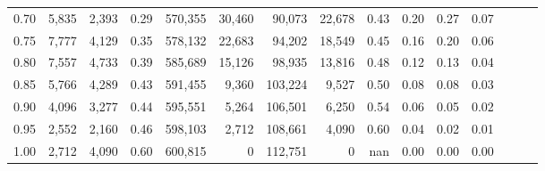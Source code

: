 \begin{tabular}{rrrrrrrrrrrrrrr}
0.70 &    5,835 &   2,393 &  0.29 &  570,355 &   30,460 &   90,073 &   22,678 &  0.43 &  0.20 &  0.27 &      0.07 \\
0.75 &    7,777 &   4,129 &  0.35 &  578,132 &   22,683 &   94,202 &   18,549 &  0.45 &  0.16 &  0.20 &      0.06 \\
0.80 &    7,557 &   4,733 &  0.39 &  585,689 &   15,126 &   98,935 &   13,816 &  0.48 &  0.12 &  0.13 &      0.04 \\
0.85 &    5,766 &   4,289 &  0.43 &  591,455 &    9,360 &  103,224 &    9,527 &  0.50 &  0.08 &  0.08 &      0.03 \\
0.90 &    4,096 &   3,277 &  0.44 &  595,551 &    5,264 &  106,501 &    6,250 &  0.54 &  0.06 &  0.05 &      0.02 \\
0.95 &    2,552 &   2,160 &  0.46 &  598,103 &    2,712 &  108,661 &    4,090 &  0.60 &  0.04 &  0.02 &      0.01 \\
1.00 &    2,712 &   4,090 &  0.60 &  600,815 &        0 &  112,751 &        0 &   nan &  0.00 &  0.00 &      0.00 \\
\bottomrule
\end{tabular}
